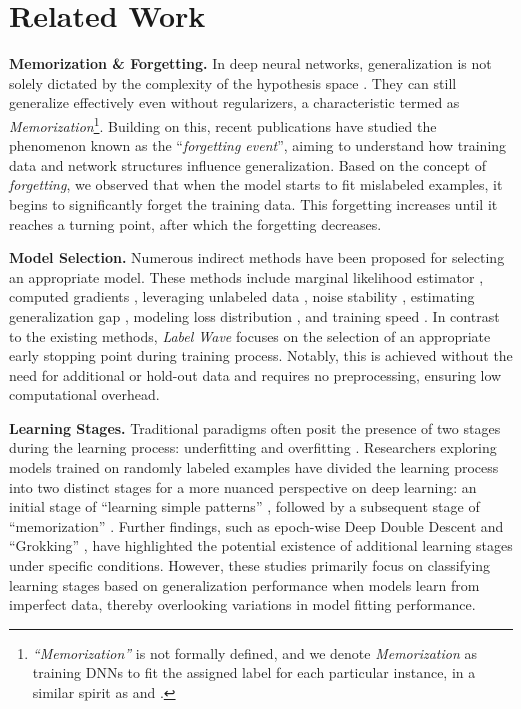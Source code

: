 \section{Related Work}
\label{gen_inst}
\textbf{Memorization \& Forgetting.}
In deep neural networks, generalization is not solely dictated by the complexity of the hypothesis space \citep{chaudhari2019entropy, advani2020high, Jiang*2020Fantastic}. They can still generalize effectively even without regularizers, a characteristic termed as \emph{Memorization}\footnote{\emph{``Memorization''} is not formally defined, and we denote \emph{Memorization} as training DNNs to fit the assigned label for each particular instance, in a similar spirit as \citet{feldman2020neural} and \citet{forouzesh2023leveraging}.}. 
Building on this, recent publications \citep{toneva2018an, feldman2020neural} have studied the phenomenon known as the ``\emph{forgetting event}'', aiming to understand how training data and network structures influence generalization. Based on the concept of \emph{forgetting}, we observed that when the model starts to fit mislabeled examples, it begins to significantly forget the training data. This forgetting increases until it reaches a turning point, after which the forgetting decreases.


\textbf{Model Selection.}
Numerous indirect methods have been proposed for selecting an appropriate model. These methods include marginal likelihood estimator \citep{pmlr-v51-duvenaud16}, computed gradients \citep{mahsereci2017early},  leveraging unlabeled data \citep{garg2021ratt, deng2021labels, forouzesh2023leveraging}, noise stability \citep{arora2018stronger, morcos2018importance, zhang2019perturbed}, estimating generalization gap \citep{jiang2018predicting, corneanu2020computing}, modeling loss distribution \citep{song2019does, song2021robust, lu2022selc}, and training speed \citep{lyle2020bayesian, ru2021speedy}.
In contrast to the existing methods, \emph{Label Wave} focuses on the selection of an appropriate early stopping point during training process. Notably, this is achieved without the need for additional or hold-out data and requires no preprocessing, ensuring low computational overhead.

\textbf{Learning Stages.}
Traditional paradigms often posit the presence of two stages during the learning process: underfitting and overfitting \citep{goodfellow2016deep, lin2023over}. Researchers exploring models trained on randomly labeled examples have divided the learning process into two distinct stages for a more nuanced perspective on deep learning: an initial stage of ``learning simple patterns'' \citep{arpit2017closer}, followed by a subsequent stage of ``memorization'' \citep{zhang2017understanding}. Further findings, such as epoch-wise Deep Double Descent \citep{belkin2019reconciling, nakkiran2021deep} and ``Grokking'' \citep{power2022grokking, liu2022towards, nanda2023progress}, have highlighted the potential existence of additional learning stages under specific conditions. However, these studies primarily focus on classifying learning stages based on generalization performance when models learn from imperfect data, thereby overlooking variations in model fitting performance.

